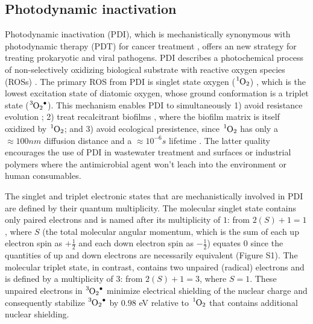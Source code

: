 \subsection*{Photodynamic inactivation}

Photodynamic inactivation (PDI), which is mechanistically synonymous with photodynamic therapy (PDT) for cancer treatment \cite{Lange2019ComparisonLines}, offers an new strategy for treating prokaryotic \cite{Hamblin2004PhotodynamicDisease,Lange2019ComparisonLines} and viral \cite{Wigginton2010OxidationInactivation,Lebedeva2020TheViruses} pathogens. PDI describes a photochemical process of non-selectively oxidizing biological substrate \cite{Choe2006MechanismsOxidation,Frankel1980LipidOxidation} with reactive oxygen species (ROSs) \cite{Zepp1992HydroxylReaction,Koppenol2001TheLater}. The primary ROS from PDI is singlet state oxygen ($\ce{^1O2}$) \cite{Ergaieg2008InvolvementPorphyrin, Allen2004IntroductionSimulations, Henze2019Multi-scaleCheckpoint, Zaman2005ComputationalMatrices,Gillespie2007StochasticKinetics}, which is the lowest excitation state of diatomic oxygen, whose ground conformation is a triplet state ($\ce{^3O2^.}$). This mechanism enables PDI to simultaneously 1) avoid resistance evolution \cite{Tavares2010AntimicrobialTreatment,Lauro2002PhotoinactivationConjugates,Pedigo2009AbsenceTherapy}; 2) treat recalcitrant biofilms \cite{Beirao2014PhotodynamicPorphyrin,Ghorbanzadeh2020ModulationModel}, where the biofilm matrix is itself oxidized by $\ce{^1O2}$; and 3) avoid ecological presistence, since $\ce{^1O2}$ has only a $\approx 100 nm$ diffusion distance and a $\approx 10^{-6} s$ lifetime \cite{Moan1984TheOxygen, Moan1990OnTissues,Rodgers1982LifetimeMeasurements}. The latter quality encourages the use of PDI in wastewater treatment \cite{Kohn2007AssociationOxygen,Mostafa2013SingletMatter,Jimenez-Hernandez2006SolarSensitizers} and surfaces \cite{McCoy2014PhotodynamicControl} or industrial polymers \cite{Kim2003DesignProblem} where the antimicrobial agent won't leach into the environment or human consumables. 

The singlet and triplet electronic states that are mechanistically involved in PDI are defined by their quantum multiplicity. The molecular singlet state contains only paired electrons and is named after its multiplicity of $1$: from $2(S)+1=1$, where $S$ (the total molecular angular momentum, which is the sum of each up electron spin as $+\frac{1}{2}$ and each down electron spin as $-\frac{1}{2}$) equates 0 since the quantities of up and down electrons are necessarily equivalent (Figure S1). The molecular triplet state, in contrast, contains two unpaired (radical) electrons and is defined by a multiplicity of $3$: from $2(S)+1=3$, where $S=1$. These unpaired electrons in $\ce{^3O2^.}$ minimize electrical shielding of the nuclear charge \cite{Katriel1972ARule} and consequently stabilize $\ce{^3O2^.}$ by $0.98$ eV \cite{Jockusch2008SingletExcitation} relative to $\ce{^1O2}$ that contains additional nuclear shielding.

